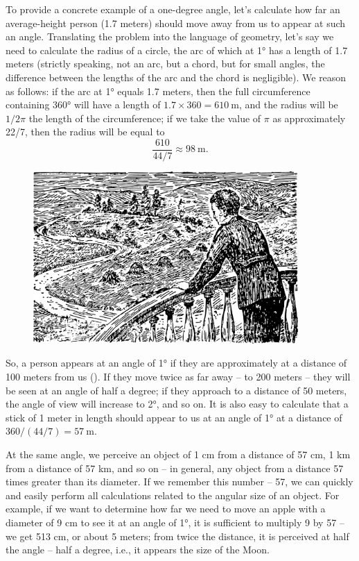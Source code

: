 To provide a concrete example of a one-degree angle, let's calculate how far an average-height person (1.7 meters) should move away from us to appear at such an angle. Translating the problem into the language of geometry, let's say we need to calculate the radius of a circle, the arc of which at \ang{1} has a length of 1.7 meters (strictly speaking, not an arc, but a chord, but for small angles, the difference between the lengths of the arc and the chord is negligible). We reason as follows: if the arc at \ang{1} equals 1.7 meters, then the full circumference containing \ang{360} will have a length of $1.7 \times 360 = \SI{610}{\meter}$, and the radius will be $1/2\pi$ the length of the circumference; if we take the value of $\pi$ as approximately 22/7, then the radius will be equal to
\begin{equation*}%
 \frac{610}{44/7} \approx \SI{98}{\meter}.
\end{equation*}
\begin{figure}[h!]
\centering
\includegraphics[width=0.9\textwidth]{figures/ch-03/fig-062.pdf}
\end{figure}
So, a person appears at an angle of \ang{1} if they are approximately at a distance of 100 meters from us (). If they move twice as far away -- to 200 meters -- they will be seen at an angle of half a degree; if they approach to a distance of 50 meters, the angle of view will increase to \ang{2}, and so on. It is also easy to calculate that a stick of 1 meter in length should appear to us at an angle of 1° at a distance of $360/(44/7) = \SI{57}{\meter}$.

At the same angle, we perceive an object of 1 cm from a distance of 57 cm, 1 km from a distance of 57 km, and so on -- in general, any object from a distance 57 times greater than its diameter. If we remember this number -- 57, we can quickly and easily perform all calculations related to the angular size of an object. For example, if we want to determine how far we need to move an apple with a diameter of 9 cm to see it at an angle of \ang{1}, it is sufficient to multiply 9 by 57 -- we get 513 cm, or about 5 meters; from twice the distance, it is perceived at half the angle -- half a degree, i.e., it appears the size of the Moon.

